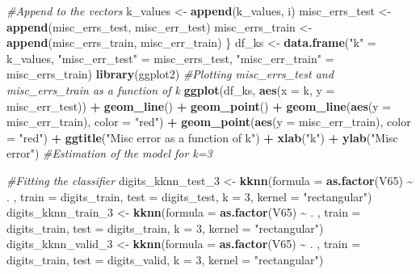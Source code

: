 \documentclass[
]{article}
\newenvironment{Shaded}{\begin{snugshade}}{\end{snugshade}}
\newcommand{\AttributeTok}[1]{\textcolor[rgb]{0.13,0.29,0.53}{#1}}
\newcommand{\CommentTok}[1]{\textcolor[rgb]{0.56,0.35,0.01}{\textit{#1}}}
\newcommand{\DecValTok}[1]{\textcolor[rgb]{0.00,0.00,0.81}{#1}}
\newcommand{\FunctionTok}[1]{\textcolor[rgb]{0.13,0.29,0.53}{\textbf{#1}}}
\newcommand{\NormalTok}[1]{#1}
\newcommand{\OtherTok}[1]{\textcolor[rgb]{0.56,0.35,0.01}{#1}}
\newcommand{\SpecialCharTok}[1]{\textcolor[rgb]{0.81,0.36,0.00}{\textbf{#1}}}
\newcommand{\StringTok}[1]{\textcolor[rgb]{0.31,0.60,0.02}{#1}}
\begin{document}
\begin{Shaded}
\begin{Highlighting}[]
  \CommentTok{\#Append to the vectors}
\NormalTok{  k\_values }\OtherTok{\textless{}{-}} \FunctionTok{append}\NormalTok{(k\_values, i)}
\NormalTok{  misc\_errs\_test }\OtherTok{\textless{}{-}} \FunctionTok{append}\NormalTok{(misc\_errs\_test, misc\_err\_test)}
\NormalTok{  misc\_errs\_train }\OtherTok{\textless{}{-}} \FunctionTok{append}\NormalTok{(misc\_errs\_train, misc\_err\_train)}
\NormalTok{\}}
\NormalTok{df\_ks }\OtherTok{\textless{}{-}} \FunctionTok{data.frame}\NormalTok{(}\StringTok{"k"} \OtherTok{=}\NormalTok{ k\_values, }\StringTok{"misc\_err\_test"} \OtherTok{=}\NormalTok{ misc\_errs\_test, }\StringTok{"misc\_err\_train"} \OtherTok{=}\NormalTok{ misc\_errs\_train)}
\FunctionTok{library}\NormalTok{(ggplot2)}
\CommentTok{\#Plotting misc\_errs\_test and misc\_errs\_train as a function of k}
\FunctionTok{ggplot}\NormalTok{(df\_ks, }\FunctionTok{aes}\NormalTok{(}\AttributeTok{x =}\NormalTok{ k, }\AttributeTok{y =}\NormalTok{ misc\_err\_test)) }\SpecialCharTok{+} \FunctionTok{geom\_line}\NormalTok{() }\SpecialCharTok{+} \FunctionTok{geom\_point}\NormalTok{() }\SpecialCharTok{+} \FunctionTok{geom\_line}\NormalTok{(}\FunctionTok{aes}\NormalTok{(}\AttributeTok{y =}\NormalTok{ misc\_err\_train), }\AttributeTok{color =} \StringTok{"red"}\NormalTok{) }\SpecialCharTok{+} \FunctionTok{geom\_point}\NormalTok{(}\FunctionTok{aes}\NormalTok{(}\AttributeTok{y =}\NormalTok{ misc\_err\_train), }\AttributeTok{color =} \StringTok{"red"}\NormalTok{) }\SpecialCharTok{+} \FunctionTok{ggtitle}\NormalTok{(}\StringTok{"Misc error as a function of k"}\NormalTok{) }\SpecialCharTok{+} \FunctionTok{xlab}\NormalTok{(}\StringTok{"k"}\NormalTok{) }\SpecialCharTok{+} \FunctionTok{ylab}\NormalTok{(}\StringTok{"Misc error"}\NormalTok{)}
\CommentTok{\#Estimation of the model for k=3}

\CommentTok{\#Fitting the classifier}
\NormalTok{digits\_kknn\_test\_3 }\OtherTok{\textless{}{-}} \FunctionTok{kknn}\NormalTok{(}\AttributeTok{formula =} \FunctionTok{as.factor}\NormalTok{(V65) }\SpecialCharTok{\textasciitilde{}}\NormalTok{ . , }\AttributeTok{train =}\NormalTok{ digits\_train, }\AttributeTok{test =}\NormalTok{ digits\_test, }\AttributeTok{k =} \DecValTok{3}\NormalTok{, }\AttributeTok{kernel =} \StringTok{"rectangular"}\NormalTok{)}
\NormalTok{digits\_kknn\_train\_3 }\OtherTok{\textless{}{-}} \FunctionTok{kknn}\NormalTok{(}\AttributeTok{formula =} \FunctionTok{as.factor}\NormalTok{(V65) }\SpecialCharTok{\textasciitilde{}}\NormalTok{ . , }\AttributeTok{train =}\NormalTok{ digits\_train, }\AttributeTok{test =}\NormalTok{ digits\_train, }\AttributeTok{k =} \DecValTok{3}\NormalTok{, }\AttributeTok{kernel =} \StringTok{"rectangular"}\NormalTok{)}
\NormalTok{digits\_kknn\_valid\_3 }\OtherTok{\textless{}{-}} \FunctionTok{kknn}\NormalTok{(}\AttributeTok{formula =} \FunctionTok{as.factor}\NormalTok{(V65) }\SpecialCharTok{\textasciitilde{}}\NormalTok{ . , }\AttributeTok{train =}\NormalTok{ digits\_train, }\AttributeTok{test =}\NormalTok{ digits\_valid, }\AttributeTok{k =} \DecValTok{3}\NormalTok{, }\AttributeTok{kernel =} \StringTok{"rectangular"}\NormalTok{)}


\end{Highlighting}
\end{Shaded}
\end{document}
